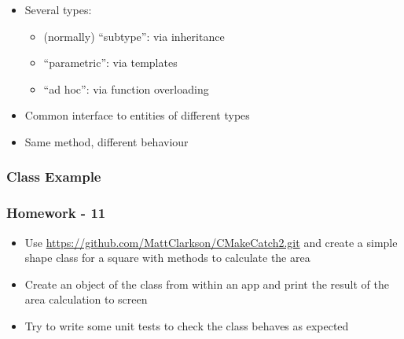 \begin{itemize}
\itemsep1pt\parskip0pt
\item
  Several types:

  \begin{itemize}
  \itemsep1pt\parskip0pt
  \item
    (normally) ``subtype'': via inheritance
  \item
    ``parametric'': via templates
  \item
    ``ad hoc'': via function overloading
  \end{itemize}
\item
  Common interface to entities of different types
\item
  Same method, different behaviour
\end{itemize}

\subsubsection{Class Example}\label{class-example-3}

\begin{Shaded}
\begin{Highlighting}[]
  
\NormalTok{\{}

   \NormalTok{;}

  \NormalTok{);}
  \NormalTok{);}
\NormalTok{\}}
\end{Highlighting}
\end{Shaded}

\subsubsection{Homework - 11}\label{homework---11}

\begin{itemize}
\itemsep1pt\parskip0pt
\item
  Use \url{https://github.com/MattClarkson/CMakeCatch2.git} and create a
  simple shape class for a square with methods to calculate the area
\item
  Create an object of the class from within an app and print the result
  of the area calculation to screen
\item
  Try to write some unit tests to check the class behaves as expected
\end{itemize}

